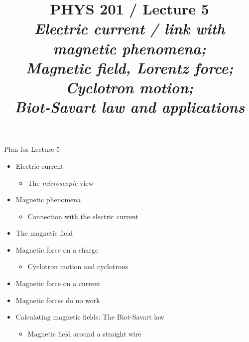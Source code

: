 \renewcommand{\prevlecture}{4 }
\renewcommand{\thislecture}{5 }
\renewcommand{\nextlecture}{6 }

%
%

\title[PHYS 201 / Lecture \thislecture]
{
  PHYS 201 / Lecture \thislecture\\
  {\it Electric current / link with magnetic phenomena;\\
        Magnetic field, Lorentz force; Cyclotron motion;\\
        Biot-Savart law and applications}\\
}



\begin{frame}[plain]
  \titlepage
\end{frame}


%
%

\renewcommand{\lecturesummarytitle}{Revision }


%
%

\begin{frame}{Plan for Lecture \thislecture}

\begin{itemize}
   \item Electric current
      \begin{itemize}
           \item The {\em microscopic} view
      \end{itemize}
   \item Magnetic phenomena
      \begin{itemize}
           \item Connection with the electric current
      \end{itemize}
   \item The magnetic field
   \item Magnetic force on a charge
      \begin{itemize}
           \item Cyclotron motion and cyclotrons
      \end{itemize}
   \item Magnetic force on a current
   \item Magnetic forces do no work
   \item Calculating magnetic fields: The Biot-Savart law
     \begin{itemize}
           \item Magnetic field around a straight wire
      \end{itemize}
\end{itemize}

\end{frame}

